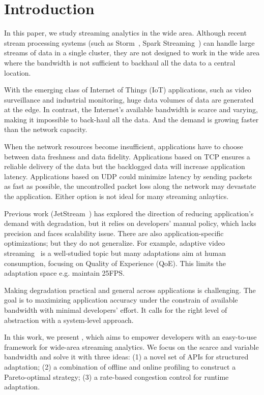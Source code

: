 \section{Introduction}

In this paper, we study streaming analytics in the wide area. Although recent
stream processing systems (such as Storm~\cite{toshniwal2014storm}, Spark
Streaming~\cite{zaharia2013discretized}) can handle large streams of data in a
single cluster, they are not designed to work in the wide area where the
bandwidth is not sufficient to backhaul all the data to a central location.

With the emerging class of Internet of Things (IoT) applications, such as video
surveillance and industrial monitoring, huge data volumes of data are generated
at the edge. In contrast, the Internet's available bandwidth is scarce and
varying, making it impossible to back-haul all the data. And the demand is
growing faster than the network capacity.

When the network resources become insufficient, applications have to choose
between data freshness and data fidelity. Applications based on TCP ensures a
reliable delivery of the data but the backlogged data will increase application
latency. Applications based on UDP could minimize latency by sending packets as
fast as possible, the uncontrolled packet loss along the network may devastate
the application. Either option is not ideal for many streaming anlaytics.

Previous work (JetStream~\cite{rabkin2014aggregation}) has explored the
direction of reducing application's demand with degradation, but it relies on
developers' manual policy, which lacks precision and faces scalability issue.
There are also application-specific optimizations; but they do not
generalize. For example, adaptive video streaming~\cite{yin2015control} is a
well-studied topic but many adaptations aim at human consumption, focusing on
Quality of Experience (QoE). This limits the adaptation space e.g. maintain
25FPS.

Making degradation practical and general across applications is challenging. The
goal is to maximizing application accuracy under the constrain of available
bandwidth with minimal developers' effort. It calls for the right level of
abstraction with a system-level approach.

In this work, we present \sysname{}, which aims to empower developers with an
easy-to-use framework for wide-area streaming analytics. We focus on the scarce
and variable bandwidth and solve it with three ideas: (1) a novel set of APIs
for structured adaptation; (2) a combination of offline and online profiling to
construct a Pareto-optimal strategy; (3) a rate-based congestion control for
runtime adaptation.

